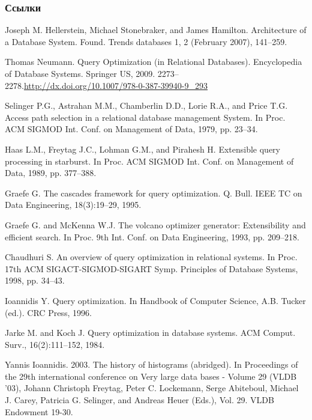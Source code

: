 \documentclass{beamer}
\begin{document}
\begin{frame}[allowframebreaks]
\frametitle{Ссылки}
\footnotesize{
\begin{thebibliography}{99}


 Joseph M. Hellerstein, Michael Stonebraker, and James Hamilton. Architecture of a Database System. Found. Trends databases 1, 2 (February 2007), 141--259. 

 Thomas Neumann. Query Optimization (in Relational Databases). Encyclopedia of Database Systems. Springer US, 2009. 2273--2278.\url{http://dx.doi.org/10.1007/978-0-387-39940-9_293}

 Selinger P.G., Astrahan M.M., Chamberlin D.D., Lorie R.A., and Price T.G. Access path selection in a relational database management System. In Proc. ACM SIGMOD Int. Conf. on Management of Data, 1979, pp. 23--34.

 Haas L.M., Freytag J.C., Lohman G.M., and Pirahesh H. Extensible query processing in starburst. In Proc. ACM SIGMOD Int. Conf. on Management of Data, 1989, pp. 377--388.

 Graefe G. The cascades framework for query optimization. Q. Bull. IEEE TC on Data Engineering, 18(3):19--29, 1995.

 Graefe G. and McKenna W.J. The volcano optimizer generator: Extensibility and efficient search. In Proc. 9th Int. Conf. on Data Engineering, 1993, pp. 209--218.

 Chaudhuri S. An overview of query optimization in relational systems. In Proc. 17th ACM SIGACT-SIGMOD-SIGART Symp. Principles of Database Systems, 1998, pp. 34--43.

 Ioannidis Y. Query optimization. In Handbook of Computer Science, A.B. Tucker (ed.). CRC Press, 1996.

 Jarke M. and Koch J. Query optimization in database systems. ACM Comput. Surv., 16(2):111–152, 1984.

  Yannis Ioannidis. 2003. The history of histograms (abridged). In Proceedings of the 29th international conference on Very large data bases - Volume 29 (VLDB '03), Johann Christoph Freytag, Peter C. Lockemann, Serge Abiteboul, Michael J. Carey, Patricia G. Selinger, and Andreas Heuer (Eds.), Vol. 29. VLDB Endowment 19-30. 


\end{thebibliography}}
\end{frame}
\end{document}
